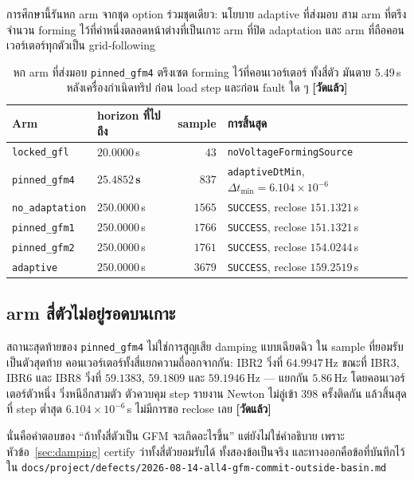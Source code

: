 \documentclass[12pt,a4paper]{article}
\theoremstyle{remark}
\newcommand{\code}[1]{\texttt{\small #1}}
\newcommand{\measured}{\textcolor{ok}{\textbf{[วัดแล้ว]}}}
\begin{document}
การศึกษานี้รันหก arm จากชุด option ร่วมชุดเดียว: นโยบาย adaptive ที่ส่งมอบ
สาม arm ที่ตรึงจำนวน forming ไว้ที่ค่าหนึ่งตลอดหน้าต่างที่เป็นเกาะ arm ที่ปิด
adaptation และ arm ที่ถือคอนเวอร์เตอร์ทุกตัวเป็น grid-following

\begin{table}[H]
\centering
\small
\begin{tabular}{@{}llrl@{}}
\toprule
\textbf{Arm} & \textbf{horizon ที่ไปถึง} & \textbf{sample} & \textbf{การสิ้นสุด}\\
\midrule
\code{locked\_gfl}     & $20.0000$\,s & $43$       & \code{noVoltageFormingSource}\\
\code{pinned\_gfm4}    & $\mathbf{25.4852}$\,\textbf{s} & $837$ & \code{adaptiveDtMin}, $\Delta t_{\min}=6.104\times10^{-6}$\\
\code{no\_adaptation}  & $250.0000$\,s & $1565$   & \code{SUCCESS}, reclose $151.1321$\,s\\
\code{pinned\_gfm1}    & $250.0000$\,s & $1766$   & \code{SUCCESS}, reclose $151.1321$\,s\\
\code{pinned\_gfm2}    & $250.0000$\,s & $1761$   & \code{SUCCESS}, reclose $154.0244$\,s\\
\code{adaptive}        & $250.0000$\,s & $3679$   & \code{SUCCESS}, reclose $159.2519$\,s\\
\bottomrule
\end{tabular}
\caption{หก arm ที่ส่งมอบ \code{pinned\_gfm4} ตรึงเซต forming ไว้ที่คอนเวอร์เตอร์
ทั้งสี่ตัว มันตาย $5.49$\,s หลังเครื่องกำเนิดทริป ก่อน load step และก่อน fault ใด ๆ
\measured}
\label{tab:armcmp}
\end{table}

\subsection{arm สี่ตัวไม่อยู่รอดบนเกาะ}

สถานะสุดท้ายของ \code{pinned\_gfm4} ไม่ใช่การสูญเสีย damping แบบเฉียดฉิว
ใน sample ที่ยอมรับเป็นตัวสุดท้าย คอนเวอร์เตอร์ทั้งสี่แยกความถี่ออกจากกัน:
IBR2 วิ่งที่ $64.9947$\,Hz ขณะที่ IBR3, IBR6 และ IBR8 วิ่งที่ $59.1383$,
$59.1809$ และ $59.1946$\,Hz --- แยกกัน $5.86$\,Hz โดยคอนเวอร์เตอร์ตัวหนึ่ง
วิ่งหนีอีกสามตัว ตัวควบคุม step รายงาน Newton ไม่ลู่เข้า 398 ครั้งติดกัน
แล้วสิ้นสุดที่ step ต่ำสุด $6.104\times10^{-6}$\,s ไม่มีการขอ reclose เลย \measured

นั่นคือคำตอบของ ``ถ้าทั้งสี่ตัวเป็น GFM จะเกิดอะไรขึ้น'' แต่ยังไม่ใช่คำอธิบาย
เพราะหัวข้อ~\ref{sec:damping} certify ว่าทั้งสี่ตัวยอมรับได้ ทั้งสองข้อเป็นจริง
และทางออกคือข้อที่บันทึกไว้ใน
\code{docs/project/defects/2026-08-14-all4-gfm-commit-outside-basin.md}
\end{document}
